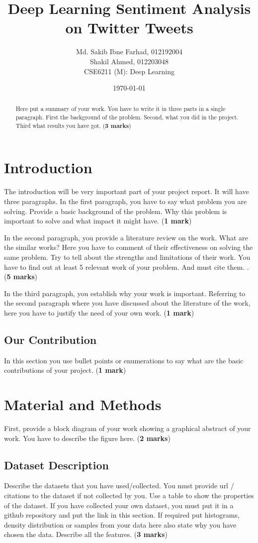 \documentclass{article}
\title{Deep Learning Sentiment Analysis on Twitter Tweets}
\author{Md. Sakib Ibne Farhad, 012192004 \\
		Shakil Ahmed, 012203048 \\		
		CSE6211 (M): Deep Learning}
\date{\today}
\begin{document}
\maketitle
\begin{abstract}
    Here put a summary of your work. You have to write it in three parts in a single paragraph. First the background of the problem. Second, what you did in the project. Third what results you have got. (\textbf{3 marks})
\end{abstract}

\section{Introduction} 
The introduction will be very important part of your project report. It will have three paragraphs. In the first paragraph, you have to say what problem you are solving. Provide a basic background of the problem. Why this problem is important to solve and what impact it might have. (\textbf{1 mark})

In the second paragraph, you provide a literature review on the work. What are the similar works? Here you have to comment of their effectiveness on solving the same problem. Try to tell about the strengths and limitations of their work. You have to find out at least 5 relevant work of your problem. And must cite them. \cite{jones2004introduction}. (\textbf{5 marks})

In the third paragraph, you establish why your work is important. Referring to the second paragraph where you have discussed about the literature of the work, here you have to justify the need of your own work. (\textbf{1 mark})

\subsection{Our Contribution}
In this section you use bullet points or enumerations to say what are the basic contributions of your project. (\textbf{1 mark})

\section{Material and Methods}
First, provide a block diagram of your work showing a graphical abstract of your work. You have to describe the figure here. (\textbf{2 marks})

\subsection{Dataset Description}
Describe the datasets that you have used/collected. You must provide url / citations to the dataset if not collected by you. Use a table to show the properties of the dataset. If you have collected your own dataset, you must put it in a github repository and put the link in this section. If required put histograms, density distribution or samples from your data here also state why you have chosen the data. Describe all the features. (\textbf{3 marks})
\end{document}
